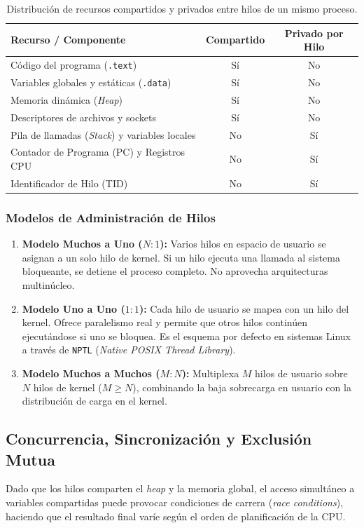 \begin{table}[htbp]
    \centering
    \begin{tabular}{|l|c|c|}
    \hline
    \textbf{Recurso / Componente} & \textbf{Compartido} & \textbf{Privado por Hilo} \\ \hline
    Código del programa (\texttt{.text}) & Sí & No \\ \hline
    Variables globales y estáticas (\texttt{.data}) & Sí & No \\ \hline
    Memoria dinámica (\textit{Heap}) & Sí & No \\ \hline
    Descriptores de archivos y sockets & Sí & No \\ \hline
    Pila de llamadas (\textit{Stack}) y variables locales & No & Sí \\ \hline
    Contador de Programa (PC) y Registros CPU & No & Sí \\ \hline
    Identificador de Hilo (TID) & No & Sí \\ \hline
    \end{tabular}
    \caption{Distribución de recursos compartidos y privados entre hilos de un mismo proceso.}
    \label{tab:prac03:recursos-hilos}
\end{table}

\subsubsection{Modelos de Administración de Hilos}
\begin{enumerate}
    \item \textbf{Modelo Muchos a Uno (\(N:1\)):} Varios hilos en espacio de usuario se asignan a un solo hilo de kernel. Si un hilo ejecuta una llamada al sistema bloqueante, se detiene el proceso completo. No aprovecha arquitecturas multinúcleo.
    \item \textbf{Modelo Uno a Uno ($1:1$):} Cada hilo de usuario se mapea con un hilo del kernel. Ofrece paralelismo real y permite que otros hilos continúen ejecutándose si uno se bloquea. Es el esquema por defecto en sistemas Linux a través de \texttt{NPTL} (\textit{Native POSIX Thread Library}).
    \item \textbf{Modelo Muchos a Muchos (\(M:N\)):} Multiplexa \(M\) hilos de usuario sobre \(N\) hilos de kernel (\(M \ge N\)), combinando la baja sobrecarga en usuario con la distribución de carga en el kernel.
\end{enumerate}

\subsection{Concurrencia, Sincronización y Exclusión Mutua}
Dado que los hilos comparten el \textit{heap} y la memoria global, el acceso simultáneo a variables compartidas puede provocar condiciones de carrera (\textit{race conditions}), haciendo que el resultado final varíe según el orden de planificación de la CPU.

